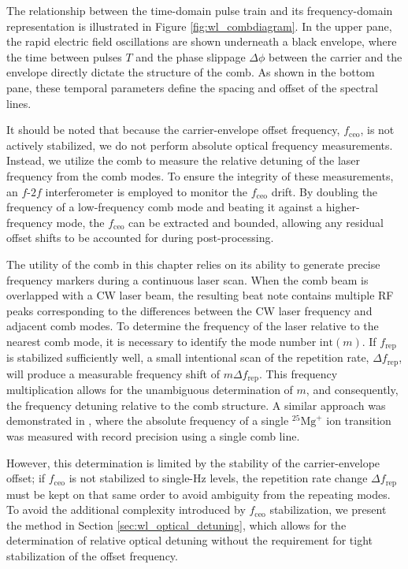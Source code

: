 \documentclass[12pt]{report}
\begin{document}
	The relationship between the time-domain pulse train and its frequency-domain representation is illustrated in Figure \ref{fig:wl_combdiagram}. In the upper pane, the rapid electric field oscillations are shown underneath a black envelope, where the time between pulses $T$ and the phase slippage $\Delta \phi$ between the carrier and the envelope directly dictate the structure of the comb. As shown in the bottom pane, these temporal parameters define the spacing and offset of the spectral lines.
	
	It should be noted that because the carrier-envelope offset frequency, $f_\mathrm{ceo}$, is not actively stabilized, we do not perform absolute optical frequency measurements. Instead, we utilize the comb to measure the relative detuning of the laser frequency from the comb modes. To ensure the integrity of these measurements, an $f\text{-}2f$ interferometer is employed to monitor the $f_\mathrm{ceo}$ drift. By doubling the frequency of a low-frequency comb mode and beating it against a higher-frequency mode, the $f_\mathrm{ceo}$ can be extracted and bounded, allowing any residual offset shifts to be accounted for during post-processing.
	
	The utility of the comb in this chapter relies on its ability to generate precise frequency markers during a continuous laser scan. When the comb beam is overlapped with a CW laser beam, the resulting beat note contains multiple RF peaks corresponding to the differences between the CW laser frequency and adjacent comb modes. To determine the frequency of the laser relative to the nearest comb mode, it is necessary to identify the mode number $\mathrm{int}(m)$. If $f_\mathrm{rep}$ is stabilized sufficiently well, a small intentional scan of the repetition rate, $\Delta f_\mathrm{rep}$, will produce a measurable frequency shift of $m\Delta f_\mathrm{rep}$. This frequency multiplication allows for the unambiguous determination of $m$, and consequently, the frequency detuning relative to the comb structure. A similar approach was demonstrated in \cite{ours_single_mg_comb_line}, where the absolute frequency of a single $^{25}\mathrm{Mg}^+$ ion transition was measured with record precision using a single comb line.
	
	However, this determination is limited by the stability of the carrier-envelope offset; if $f_\mathrm{ceo}$ is not stabilized to single-Hz levels, the repetition rate change $\Delta f_\mathrm{rep}$ must be kept on that same order to avoid ambiguity from the repeating modes. To avoid the additional complexity introduced by $f_\mathrm{ceo}$ stabilization, we present the method in Section \ref{sec:wl_optical_detuning}, which allows for the determination of relative optical detuning without the requirement for tight stabilization of the offset frequency.
	
\end{document}
